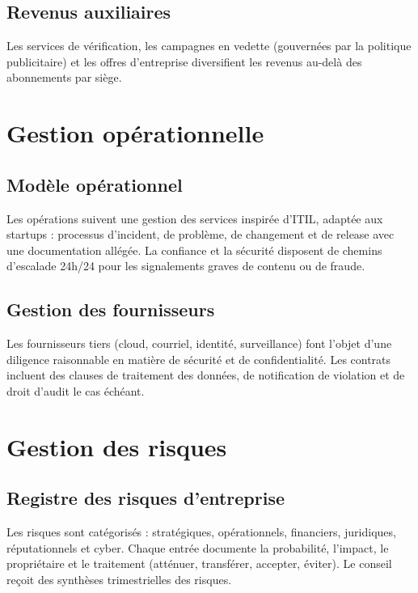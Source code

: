 \subsection{Revenus auxiliaires}

Les services de vérification, les campagnes en vedette (gouvernées par la politique publicitaire) et les offres d'entreprise diversifient les revenus au-delà des abonnements par siège.

\section{Gestion opérationnelle}

\subsection{Modèle opérationnel}

Les opérations suivent une gestion des services inspirée d'ITIL, adaptée aux startups \parencite{axelos2019itil} : processus d'incident, de problème, de changement et de release avec une documentation allégée. La confiance et la sécurité disposent de chemins d'escalade 24h/24 pour les signalements graves de contenu ou de fraude.

\subsection{Gestion des fournisseurs}

Les fournisseurs tiers (cloud, courriel, identité, surveillance) font l'objet d'une diligence raisonnable en matière de sécurité et de confidentialité. Les contrats incluent des clauses de traitement des données, de notification de violation et de droit d'audit le cas échéant.

\section{Gestion des risques}

\subsection{Registre des risques d'entreprise}

Les risques sont catégorisés : stratégiques, opérationnels, financiers, juridiques, réputationnels et cyber. Chaque entrée documente la probabilité, l'impact, le propriétaire et le traitement (atténuer, transférer, accepter, éviter). Le conseil reçoit des synthèses trimestrielles des risques.


